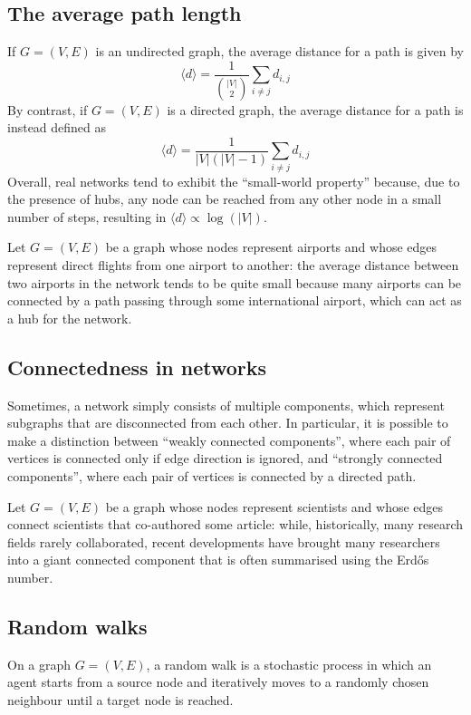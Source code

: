 \documentclass{report}
\begin{document}
\subsection{The average path length}
If $\displaystyle G = (V, E)$ is an undirected graph, the average distance for a path is given by
\[\langle d \rangle = \frac{1}{\binom{|V|}{2}}\sum_{i \neq j} d_{i, j}\]
By contrast, if $\displaystyle G = (V, E)$ is a directed graph, the average distance for a path is instead defined as
\[\langle d \rangle = \frac{1}{|V|(|V| - 1)}\sum_{i \neq j} d_{i, j}\]
Overall, real networks tend to exhibit the ``small-world property'' because, due to the presence of hubs, any node can be reached from any other node in a small number of steps, resulting in $\displaystyle \langle d \rangle \propto \log(|V|)$.
\begin{examplebox}
    Let $\displaystyle G = (V, E)$ be a graph whose nodes represent airports and whose edges represent direct flights from one airport to another: the average distance between two airports in the network tends to be quite small because many airports can be connected by a path passing through some international airport, which can act as a hub for the network.
\end{examplebox}
\subsection{Connectedness in networks}
Sometimes, a network simply consists of multiple components, which represent subgraphs that are disconnected from each other. \newline
In particular, it is possible to make a distinction between ``weakly connected components'', where each pair of vertices is connected only if edge direction is ignored, and ``strongly connected components'', where each pair of vertices is connected by a directed path.
\begin{examplebox}
    Let $\displaystyle G = (V, E)$ be a graph whose nodes represent scientists and whose edges connect scientists that co-authored some article: while, historically, many research fields rarely collaborated, recent developments have brought many researchers into a giant connected component that is often summarised using the Erdős number.
\end{examplebox}
\subsection{Random walks}
On a graph $\displaystyle G = (V, E)$, a random walk is a stochastic process in which an agent starts from a source node and iteratively moves to a randomly chosen neighbour until a target node is reached.
\end{document}

